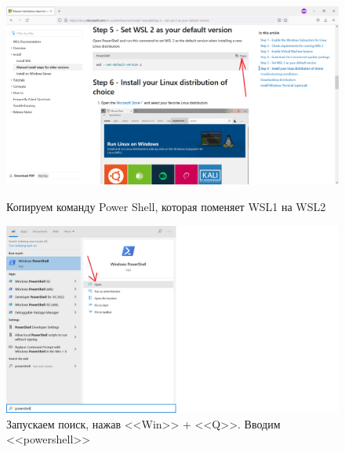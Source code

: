 \begin{figure}[!p]
    \centering
    \begin{minipage}{0.47\textwidth}
        \centering
        \includegraphics[width=\linewidth]
            {_assets/gpi_pz_docker_11.png}
        \caption{Копируем команду Power Shell, которая поменяет WSL1 на WSL2}
        \label{fig:gpi_pz_docker_11}
    \end{minipage}
    \begin{minipage}{0.47\textwidth}
        \centering
        \includegraphics[width=\linewidth]
            {_assets/gpi_pz_docker_12.png}
        \caption{Запускаем поиск, нажав <<Win>> + <<Q>>. Вводим <<powershell>>}
        \label{fig:gpi_pz_docker_12}
    \end{minipage}
\end{figure}

